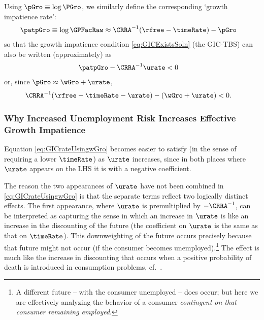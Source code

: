\documentclass{\handout}
\begin{document}
Using $\pGro \equiv \log \PGro$, we similarly define the corresponding `growth impatience rate':
\begin{equation}\begin{gathered}\begin{aligned}
  \patpGro & \equiv  \log \GPFacRaw \approx \CRRA^{-1}(\rfree-\timeRate) - \pGro
\end{aligned}\end{gathered}\end{equation}
so that the growth impatience condition \eqref{eq:GICExistsSoln} (the GIC-TBS) can also be written (approximately) as
\begin{equation}\begin{gathered}\begin{aligned}
  \patpGro - \CRRA^{-1}\urate & <  0   \label{eq:GICrateUsingpGro}
\end{aligned}\end{gathered}\end{equation}
or, since $\pGro \approx \wGro+\urate$, 
\begin{equation}\begin{gathered}\begin{aligned}
 \CRRA^{-1}(\rfree-\timeRate-\urate)-(\wGro+\urate) & <  0 \label{eq:GICrateUsingwGro}
.
\end{aligned}\end{gathered}\end{equation}

\subsubsection{Why Increased Unemployment Risk Increases Effective Growth Impatience}

Equation \eqref{eq:GICrateUsingwGro} becomes easier to satisfy (in the sense of requiring  a lower $\timeRate$) as $\urate$ increases, since in both places where $\urate$ appears on the LHS it is with a negative coefficient.

The reason the two appearances of $\urate$ have not been combined in \eqref{eq:GICrateUsingwGro} is that the separate 
terms reflect two logically distinct effects.  The first appearance, where $\urate$ is premultiplied by $-\CRRA^{-1}$, 
can be interpreted as capturing the sense in which an increase in $\urate$ is like an increase in the discounting of the future (the
coefficient on $\urate$ is the same as that on $\timeRate$).  This downweighting of the future occurs precisely because that future
might not occur (if the consumer becomes unemployed).\footnote{A different future -- with the consumer unemployed -- does occur; but here we are effectively analyzing the behavior of a consumer {\it contingent on that consumer remaining employed}.}  The effect is much like the increase in discounting that occurs 
when a positive probability of death is introduced in consumption problems, cf.~\cite{blanchardFinite}.
\end{document}
